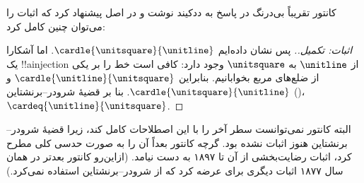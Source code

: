 \documentclass[../../../include/open-logic-section]{subfiles}
\begin{document}
کانتور تقریباً بی‌درنگ در پاسخ به ددکیند نوشت و در اصل پیشنهاد کرد که
اثبات را می‌توان چنین کامل کرد:

\begin{proof}[اثبات: تکمیل.]
پس نشان داده‌ایم $\cardle{\unitsquare}{\unitline}$. اما آشکارا یک
!!a{injection} از $\unitline$ به $\unitsquare$ وجود دارد: کافی است خط را
بر یکی از ضلع‌های مربع بخوابانیم. بنابراین
$\cardle{\unitline}{\unitsquare}$ و
$\cardle{\unitsquare}{\unitline}$. بنا بر قضیهٔ شرودر--برنشتاین
()،
$\cardeq{\unitline}{\unitsquare}$.
\end{proof}

البته کانتور نمی‌توانست سطر آخر را با این اصطلاحات کامل کند، زیرا قضیهٔ
شرودر--برنشتاین هنوز اثبات نشده بود. گرچه کانتور بعداً آن را به صورت حدسی
کلی مطرح کرد، اثبات رضایت‌بخشی از آن تا ۱۸۹۷ به دست نیامد. (ازاین‌رو
کانتور بعدتر در همان سال ۱۸۷۷ اثبات دیگری برای
 عرضه کرد که از شرودر--برنشتاین استفاده نمی‌کرد.)
\end{document}
